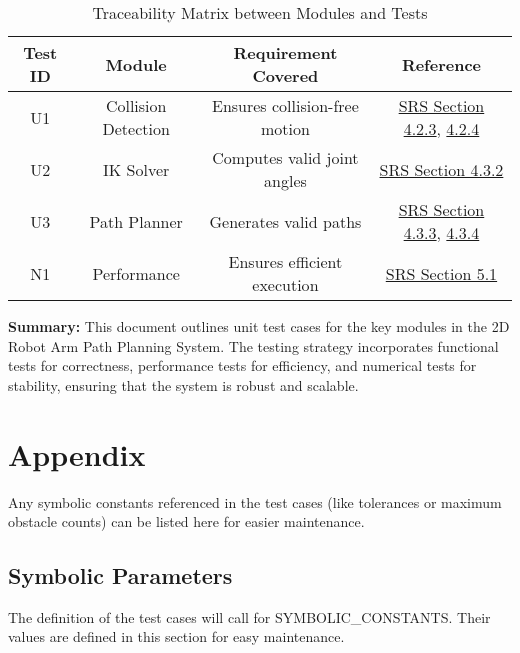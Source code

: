 \documentclass[12pt, titlepage]{article}
\begin{document}
\begin{table}[h]
    \centering
    \caption{Traceability Matrix between Modules and Tests}
    \begin{tabular}{|c|c|c|c|}
    \hline
    \textbf{Test ID} & \textbf{Module} & \textbf{Requirement Covered} & \textbf{Reference} \\
    \hline
    U1 & Collision Detection & Ensures collision-free motion & \href{SRS.pdf#section.4.2.3}{SRS Section 4.2.3}, \href{SRS.pdf#section.4.2.4}{4.2.4} \\
    U2 & IK Solver & Computes valid joint angles & \href{SRS.pdf#section.4.3.2}{SRS Section 4.3.2} \\
    U3 & Path Planner & Generates valid paths & \href{SRS.pdf#section.4.3.3}{SRS Section 4.3.3}, \href{SRS.pdf#section.4.3.4}{4.3.4} \\
    N1 & Performance & Ensures efficient execution & \href{SRS.pdf#section.5.1}{SRS Section 5.1} \\
    \hline
    \end{tabular}
    \end{table}




\textbf{Summary:} This document outlines unit test cases for the key modules in the 2D Robot Arm Path Planning System. The testing strategy incorporates functional tests for correctness, performance tests for efficiency, and numerical tests for stability, ensuring that the system is robust and scalable.





\newpage


\section{Appendix}

Any symbolic constants referenced in the test cases (like tolerances or maximum obstacle counts) can be listed here for easier maintenance.

\subsection{Symbolic Parameters}

The definition of the test cases will call for SYMBOLIC\_CONSTANTS.
Their values are defined in this section for easy maintenance.



\newpage{}
\end{document}
